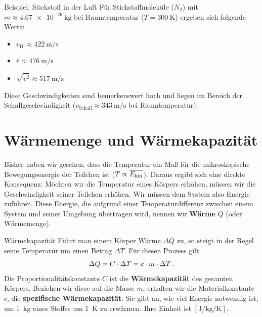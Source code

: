 \begin{examplebox}{Beispiel: Stickstoff in der Luft}
    Für Stickstoffmoleküle ($N_2$) mit $m \approx \SI{4.67e-26}{\kilo\gram}$ bei Raumtemperatur ($T = \SI{300}{\kelvin}$) ergeben sich folgende Werte:
    \begin{itemize}
        \item $v_W \approx \SI{422}{\meter\per\second}$
        \item $\overline{v} \approx \SI{476}{\meter\per\second}$
        \item $\sqrt{\overline{v^2}} \approx \SI{517}{\meter\per\second}$
    \end{itemize}
    Diese Geschwindigkeiten sind bemerkenswert hoch und liegen im Bereich der Schallgeschwindigkeit ($v_{\text{Schall}} \approx \SI{343}{\meter\per\second}$ bei Raumtemperatur).
\end{examplebox}

\section{Wärmemenge und Wärmekapazität}\label{sec: waermemenge_waermekapazitaet}
Bisher haben wir gesehen, dass die Temperatur ein Maß für die mikroskopische Bewegungsenergie der Teilchen ist ($T \propto \overline{E_{\mathrm{kin}}}$). 
Daraus ergibt sich eine direkte Konsequenz: Möchten wir die Temperatur eines Körpers erhöhen, müssen wir die Geschwindigkeit seiner Teilchen erhöhen. Wir müssen dem System also Energie zuführen.
Diese Energie, die aufgrund einer Temperaturdifferenz zwischen einem System und seiner Umgebung übertragen wird, nennen wir \textbf{Wärme} $Q$ (oder Wärmemenge).
\begin{importantbox}{Wärmekapazität}
    Führt man einem Körper Wärme $\Delta Q$ zu, so steigt in der Regel seine Temperatur um einen Betrag $\Delta T$. Für diesen Prozess gilt:
    \begin{equation}\label{eq: waermemenge_def}
        \Delta Q = C \cdot \Delta T = c \cdot m \cdot \Delta T \,.
    \end{equation}
    Die Proportionalitätskonstante $C$ ist die \textbf{Wärmekapazität} des gesamten Körpers. 
    Beziehen wir diese auf die Masse $m$, erhalten wir die Materialkonstante $c$, die \textbf{spezifische Wärmekapazität}.
    Sie gibt an, wie viel Energie notwendig ist, um \SI{1}{\kilo\gram} eines Stoffes um \SI{1}{\kelvin} zu erwärmen. Ihre Einheit ist $[\si{\joule\per\kilogram\per\kelvin}]$.
\end{importantbox}

